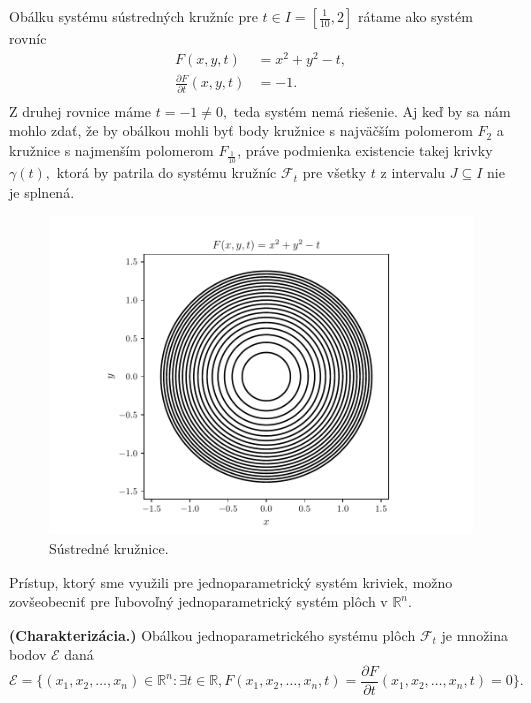 \begin{example} 
Obálku systému sústredných kružníc pre $t \in I=[\frac{1}{10},2]$ rátame ako systém rovníc
\begin{align*}
F(x, y, t) &= x^2 + y^2 - t, \\
\frac{\partial F}{\partial t}(x,y,t) &= -1. \\
\end{align*}
Z druhej rovnice máme $t=-1 \neq 0,$ teda systém nemá riešenie. Aj keď by sa nám mohlo zdať, že by obálkou mohli byť body kružnice s najväčším polomerom $F_2$ a kružnice s najmenším polomerom $F_{\frac{1}{10}}$, práve podmienka existencie takej krivky $\gamma(t),$ ktorá by patrila do systému kružníc $\mathcal{F}_t$ pre všetky $t$ z intervalu $J \subseteq  I $ nie je splnená.
\end{example}

\begin{figure}[H]
	\centering
	\includegraphics{images/concentric_circles.pdf}
	\caption{Sústredné kružnice.}
	\label{fig:concentric_circles}
\end{figure}


Prístup, ktorý sme využili pre jednoparametrický systém kriviek, možno zovšeobecniť pre ľubovoľný jednoparametrický systém plôch v $\mathbb{R}^n.$

\begin{definition}{\textbf{\textup{(Charakterizácia.)}}}
Obálkou jednoparametrického systému plôch $ \mathcal{F}_{t} $ je množina bodov $\mathcal{E}$ daná
$$\mathcal{E} = \{(x_{1}, x_{2}, \dots, x_{n})  \in \mathbb{R}^{n} \colon \exists t \in \mathbb{R}, F(x_{1}, x_{2}, \dots, x_{n}, t) = \frac{\partial F}{\partial t}(x_{1}, x_{2}, \dots, x_{n}, t) = 0 \}.$$
\end{definition}

